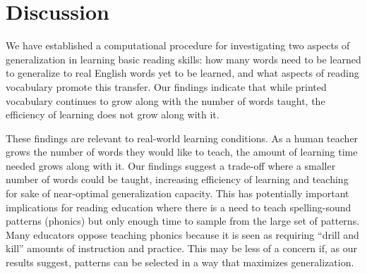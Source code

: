 \documentclass[10pt,letterpaper]{article}
\newcommand{\exword}[1]{\MakeUppercase{#1}}
\begin{document}
%


\section{Discussion}
We have established a computational procedure for investigating two aspects of generalization in learning basic reading skills: how many words need to be learned to generalize to real English words yet to be learned, and what aspects of reading vocabulary promote this transfer.  Our findings indicate that while printed vocabulary continues to grow along with the number of words taught, the efficiency of learning does not grow along with it.

These findings are relevant to real-world learning conditions. As a human teacher grows the number of words they would like to teach, the amount of learning time needed grows along with it. Our findings suggest a trade-off where a smaller number of words could be taught, increasing efficiency of learning and teaching for sake of near-optimal generalization capacity. This has potentially important implications for reading education where there is a need to teach spelling-sound patterns (phonics) but only enough time to sample from the large set of patterns. Many educators oppose teaching phonics because it is seen as requiring ``drill and kill'' amounts of instruction and practice. This may be less of a concern if, as our results suggest, patterns can be selected in a way that maximizes generalization.
\end{document}
